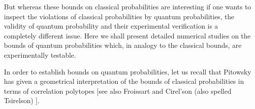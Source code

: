 But whereas these bounds on classical probabilities are interesting
if one wants to inspect
the violations of classical probabilities by quantum probabilities,
the validity of quantum probability and their experimental verification is a completely
different issue.
Here we shall present detailed numerical studies on the bounds of quantum probabilities which,
in analogy to the classical bounds, are experimentally testable.

In order to establish bounds on quantum probabilities, let us recall that
Pitowsky has given a geometrical interpretation of the bounds of classical probabilities
in terms of correlation polytopes \cite{pitowsky-86,pitowsky,pitowsky-89a,Pit-91,Pit-94}
[see also Froissart \cite{froissart-81} and
Cirel'son (also spelled Tsirelson) \cite{cirelson:80,cirelson}].

